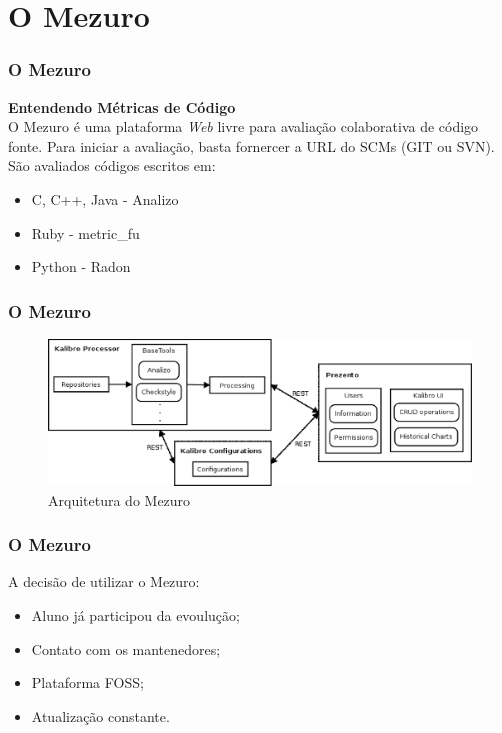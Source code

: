 \documentclass{beamer}
\begin{document}
\section{O Mezuro} %

\begin{frame}
\frametitle{O Mezuro}

\center
\textbf{Entendendo Métricas de Código} \\
O Mezuro é uma plataforma \textit{Web} livre para avaliação colaborativa de código fonte. Para iniciar a avaliação, basta fornercer a URL do SCMs (GIT ou SVN). São avaliados códigos escritos em:
\begin{itemize}
\item C, C++, Java - Analizo
\item Ruby - metric\_fu
\item Python - Radon
\end{itemize}

\end{frame}


\begin{frame}
\frametitle{O Mezuro}

\begin{figure}[!htb]
  \centering
    \includegraphics[keepaspectratio=true,scale=0.4]
    {../figuras/mezuroCloudArch.eps}
  \caption{Arquitetura do Mezuro \cite{camarinhaOSS2015}}
  \label{fig:parallel}
\end{figure}

\end{frame}


\begin{frame}
\frametitle{O Mezuro}

A decisão de utilizar o Mezuro:
\begin{itemize}
\item Aluno já participou da evoulução;
\item Contato com os mantenedores;
\item Plataforma FOSS;
\item Atualização constante.
\end{itemize}

\end{frame}
\end{document}
